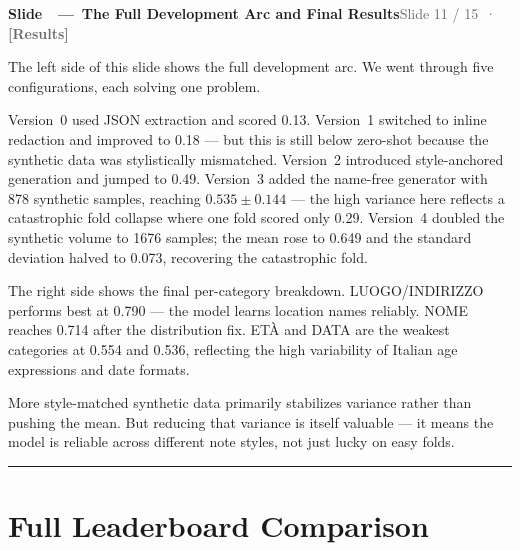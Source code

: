 \documentclass[11pt,a4paper]{article}
\newcommand{\phaselabel}[2]{\textbf{\textcolor{#1}{[#2]}}}
\newcounter{slidectr}
\newcommand{\slidescript}[3]{%
  \stepcounter{slidectr}
  \begin{slidebox}
    \noindent\textbf{Slide \theslidectr\ \,—\, #1}\hfill\small\textcolor{dimgray}{#2}
  \end{slidebox}
  \vspace{0.4em}
  #3
  \vspace{1.2em}
  \noindent\textcolor{dimgray!60}{\rule{\linewidth}{0.4pt}}
  \vspace{0.6em}
}
\begin{document}
\slidescript{The Full Development Arc and Final Results}{Slide 11 / 15 \,·\, \phaselabel{results}{Results}}{

The left side of this slide shows the full development arc. We went through five configurations, each solving one problem.

Version~0 used JSON extraction and scored 0.13. Version~1 switched to inline redaction and improved to 0.18 — but this is still below zero-shot because the synthetic data was stylistically mismatched. Version~2 introduced style-anchored generation and jumped to 0.49. Version~3 added the name-free generator with 878 synthetic samples, reaching $0.535 \pm 0.144$ — the high variance here reflects a catastrophic fold collapse where one fold scored only 0.29. Version~4 doubled the synthetic volume to 1676 samples; the mean rose to 0.649 and the standard deviation halved to 0.073, recovering the catastrophic fold.

The right side shows the final per-category breakdown. LUOGO/INDIRIZZO performs best at 0.790 — the model learns location names reliably. NOME reaches 0.714 after the distribution fix. ETÀ and DATA are the weakest categories at 0.554 and 0.536, reflecting the high variability of Italian age expressions and date formats.

More style-matched synthetic data primarily stabilizes variance rather than pushing the mean. But reducing that variance is itself valuable — it means the model is reliable across different note styles, not just lucky on easy folds.

}

\section{Full Leaderboard Comparison}
\end{document}
